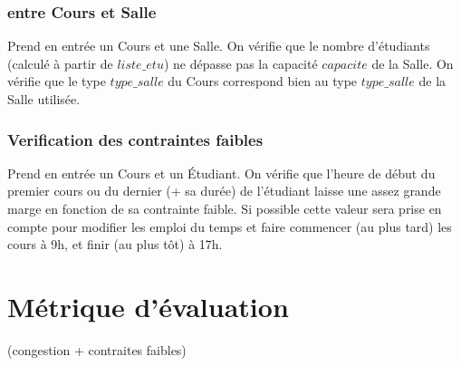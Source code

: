 \documentclass[a4paper,11pt]{article}
\begin{document}
		\subsubsection{entre Cours et Salle}
			Prend en entrée un Cours et une Salle.
			On vérifie que le nombre d'étudiants (calculé à partir de $liste\_etu$) ne dépasse pas la capacité $capacite$ de la Salle.
			On vérifie que le type $type\_salle$ du Cours correspond bien au type $type\_salle$ de la Salle utilisée.
		\subsubsection{Verification des contraintes faibles}
			Prend en entrée un Cours et un Étudiant.
			On vérifie que l'heure de début du premier cours ou du dernier (+ sa durée) de l'étudiant laisse une assez grande marge en fonction de sa contrainte faible.
			Si possible cette valeur sera prise en compte pour modifier les emploi du temps et faire commencer (au plus tard) les cours à 9h, et finir (au plus tôt) à 17h.
\section{Métrique d'évaluation}
	(congestion + contraites faibles)
\end{document}

